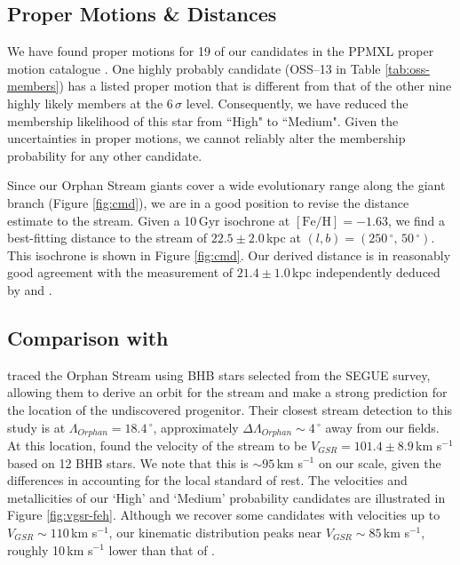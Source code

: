 \documentclass[10pt,apjl]{emulateapj}
\begin{document}
\break
\subsection{Proper Motions \& Distances}

We have found proper motions for 19 of our candidates in the PPMXL proper motion catalogue \citep{Roeser_et-al_2010}. One highly probably candidate (OSS--13 in Table \ref{tab:oss-members}) has a listed proper motion that is different from that of the other nine highly likely members at the $6\,\sigma$ level. Consequently, we have reduced the membership likelihood of this star from ``High" to ``Medium". Given the uncertainties in proper motions, we cannot reliably alter the membership probability for any other candidate.

Since our Orphan Stream giants cover a wide evolutionary range along the giant branch (Figure \ref{fig:cmd}), we are in a good position to revise the distance estimate to the stream. Given a 10\,Gyr \citet{Girardi_et-al_2008} isochrone at $[\mbox{Fe/H}] = -1.63$, we find a best-fitting distance to the stream of $22.5 \pm 2.0$\,kpc at $(l, b) = (250\,^\circ,\,50\,^\circ)$. This isochrone is shown in Figure \ref{fig:cmd}. Our derived distance is in reasonably good agreement with the measurement of $21.4 \pm 1.0$\,kpc independently deduced by \citet{Grillmair_2006} and \citet{Newberg_et-al_2010}.


\subsection{Comparison with \citet{Newberg_et-al_2010}}
\label{sec:newberg}
\citet{Newberg_et-al_2010} traced the Orphan Stream using BHB stars selected from the SEGUE survey, allowing them to derive an orbit for the stream and make a strong prediction for the location of the undiscovered progenitor. Their closest stream detection to this study is at $\Lambda_{Orphan} = 18.4\,^\circ$, approximately $\Delta\Lambda_{Orphan} \sim 4\,^\circ$ away from our fields. At this location, \citet{Newberg_et-al_2010} found the velocity of the stream to be $V_{GSR} = 101.4 \pm 8.9$\,km s$^{-1}$ based on 12 BHB stars. We note that this is $\sim95$\,km s$^{-1}$ on our scale, given the differences in accounting for the local standard of rest. The velocities and metallicities of our `High' and `Medium' probability candidates are illustrated in Figure \ref{fig:vgsr-feh}. Although we recover some candidates with velocities up to $V_{GSR} \sim 110$\,km s$^{-1}$, our kinematic distribution peaks near $V_{GSR} \sim 85$\,km s$^{-1}$, roughly 10\,km s$^{-1}$ lower than that of \citet{Newberg_et-al_2010}.
\end{document}

